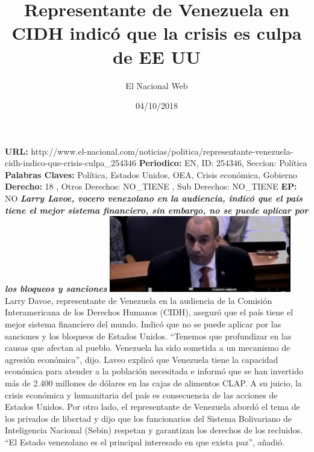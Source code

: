\documentclass{article}%
\title{\textbf{Representante de Venezuela en CIDH indicó que la crisis es culpa de EE UU}}%
\author{El Nacional Web}%
\date{04/10/2018}%
\begin{document}
%
\normalsize%
\maketitle%
\textbf{URL: }%
http://www.el{-}nacional.com/noticias/politica/representante{-}venezuela{-}cidh{-}indico{-}que{-}crisis{-}culpa\_254346\newline%
%
\textbf{Periodico: }%
EN, %
ID: %
254346, %
Seccion: %
Política\newline%
%
\textbf{Palabras Claves: }%
Política, Estados Unidos, OEA, Crisis económica, Gobierno\newline%
%
\textbf{Derecho: }%
18%
, Otros Derechos: %
NO\_TIENE%
, Sub Derechos: %
NO\_TIENE%
\newline%
%
\textbf{EP: }%
NO\newline%
\newline%
%
\textbf{\textit{Larry Lavoe, vocero venezolano en la audiencia, indicó que el país tiene el mejor sistema financiero, sin embargo, no se puede aplicar por los bloqueos y sanciones}}%
\newline%
\newline%
%
\includegraphics[width=300px]{191.jpg}%
\newline%
%
Larry Davoe, representante de Venezuela en la audiencia de la Comisión Interamericana de los Derechos Humanos (CIDH), aseguró que el país tiene el mejor sistema financiero del mundo. Indicó que no se puede aplicar por las sanciones y los bloqueos de Estados Unidos.%
\newline%
%
“Tenemos que profundizar en las causas que afectan al pueblo. Venezuela ha sido sometida a un mecanismo de agresión económica”, dijo.%
\newline%
%
Laveo explicó que Venezuela tiene la capacidad económica para atender a la población necesitada e informó que se han invertido más de 2.400 millones de dólares en las cajas de alimentos CLAP. A su juicio, la crisis económica y humanitaria del país es consecuencia de las acciones de Estados Unidos.%
\newline%
%
Por otro lado, el representante de Venezuela abordó el tema de los privados de libertad y dijo que los funcionarios del Sistema Bolivariano de Inteligencia Nacional (Sebin) respetan y garantizan los derechos de los recluidos.%
\newline%
%
“El Estado venezolano es el principal interesado en que exista paz”, añadió.%
\newline%
%
\end{document}

